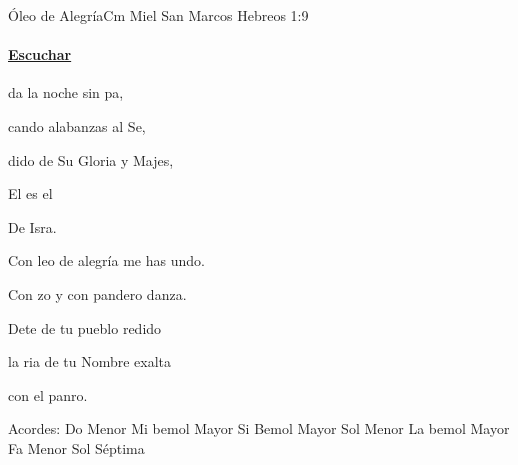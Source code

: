 \documentclass[12pt, spanish]{book}
\begin{document}
    \begin{song}{Óleo de Alegría}{Cm}
    {} %
    {Miel San Marcos}
    {Hebreos 1:9} %
    {}
        \ifChordBk
        \paragraph{\mbox{}\hfill\protect\href{https://open.spotify.com/intl-es/track/56W5sxRrdEjCgAO0ZrWWVK}{Escuchar}\mbox{}\hfill}
        \fi


        \begin{SBChorus}
            da la noche sin pa,

            cando alabanzas al Se,

            dido de Su Gloria y Majes,

            El es el 

            De Isra.
        \end{SBChorus}

        \begin{SBOpGroup}
            Con leo de alegría me has undo.

            Con zo y con pandero danza.

            Dete de tu pueblo redido

            la ria de tu Nombre exalta

            con el panro.
        \end{SBOpGroup}

        \ifChordBk
        \begin{SBOpGroup}
            Acordes:
            \upchord{\Cm}\qquad Do Menor \hfill
            \upchord{\Eflat}\qquad Mi bemol Mayor \hfill\null\break
            \upchord{\Bflat}\qquad Si Bemol Mayor \hfill
            \upchord{\Gm}\qquad Sol Menor \hfill\null\break
            \upchord{\Aflat}\qquad La bemol Mayor \hfill
            \upchord{\Fm}\qquad Fa Menor \hfill\null\break
            \upchord{\Gseven}\qquad Sol S\'eptima \hfill
        \end{SBOpGroup}
        \fi
    \end{song}
\end{document}
